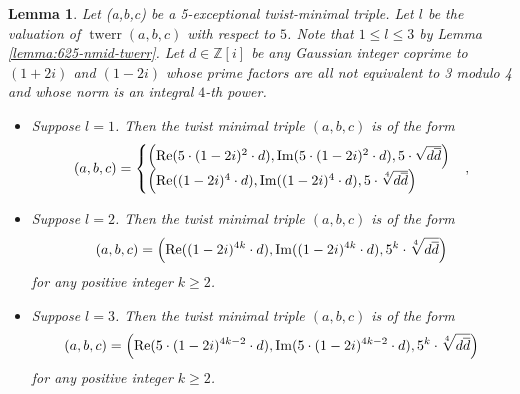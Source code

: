 \documentclass[12pt]{amsart}
\newcounter{counter}[section] %
\numberwithin{equation}{section} %
\newtheorem{lemma}[counter]{Lemma}
\theoremstyle{definition} \newtheorem{definition}[counter]{Definition}
\theoremstyle{remark} \newtheorem{nonexam}[counter]{Non-example}
\renewcommand{\Re}{\mathrm{Re}} %
\renewcommand{\Im}{\mathrm{Im}} %
\let\originalleft\left \let\originalright\right
\renewcommand{\left}{\mathopen{}\mathclose\bgroup\originalleft}
\renewcommand{\right}{\aftergroup\egroup\originalright}
\DeclareMathOperator{\twerr}{twerr} %
\begin{document}
\begin{lemma}
    Let (a,b,c) be a 5-exceptional twist-minimal triple. Let $l$ be the valuation of $\twerr(a,b,c)$ with respect to $5$. Note that $1 \leq l \leq 3$ by Lemma \ref{lemma:625-nmid-twerr}. Let $d \in \mathbb{Z}[i]$ be any Gaussian integer coprime to $(1+2i)$ and $(1-2i)$ whose prime factors are all not equivalent to 3 modulo 4 and whose norm is an integral $4$-th power. 
    \begin{itemize}
        \item Suppose $l = 1$. Then the twist minimal triple $(a,b,c)$ is of the form
        \begin{equation}
            (a,b,c) = \begin{cases} \left(\Re(5 \cdot (1-2i)^2 \cdot d), \Im(5 \cdot (1-2i)^2 \cdot d), 5 \cdot \sqrt{d \overline{d}} \right) \\
            \left(\Re((1-2i)^4 \cdot d), \Im((1-2i)^4 \cdot d), 5 \cdot \sqrt[4]{d \overline{d}} \right)
            \end{cases},
        \end{equation}
        \item Suppose $l = 2$. Then the twist minimal triple $(a,b,c)$ is of the form
        \begin{equation}
            (a,b,c) = \left(\Re((1-2i)^{4k} \cdot d), \Im((1-2i)^{4k} \cdot d), 5^k \cdot \sqrt[4]{d \overline{d}} \right)
        \end{equation}
        for any positive integer $k \geq 2$.
        \item Suppose $l = 3$. Then the twist minimal triple $(a,b,c)$ is of the form
        \begin{equation}
            (a,b,c) = \left(\Re(5 \cdot (1-2i)^{4k-2} \cdot d), \Im(5 \cdot (1-2i)^{4k-2} \cdot d), 5^k \cdot \sqrt[4]{d \overline{d}} \right)
        \end{equation}
        for any positive integer $k \geq 2$.
    \end{itemize}
\end{lemma}
\end{document}
